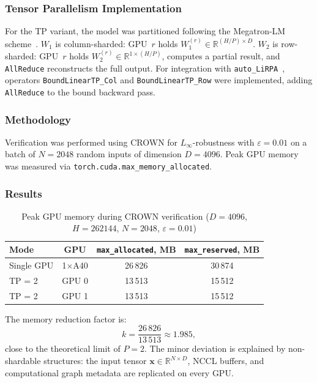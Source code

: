 \subsubsection{Tensor Parallelism Implementation}

For the TP variant, the model was partitioned following the Megatron-LM
scheme~\cite{MegatronLM2020}. $W_1$ is column-sharded: GPU~$r$ holds
$W_1^{(r)} \in \mathbb{R}^{(H/P) \times D}$. $W_2$ is row-sharded: GPU~$r$
holds $W_2^{(r)} \in \mathbb{R}^{1 \times (H/P)}$, computes a partial result,
and \texttt{AllReduce} reconstructs the full output. For integration with
\texttt{auto\_LiRPA}~\cite{AutoLiRPARepo}, operators \texttt{BoundLinearTP\_Col}
and \texttt{BoundLinearTP\_Row} were implemented, adding \texttt{AllReduce} to
the bound backward pass.

\subsubsection{Methodology}

Verification was performed using CROWN for $L_\infty$-robustness with
$\varepsilon = 0.01$ on a batch of $N = 2048$ random inputs of dimension
$D = 4096$. Peak GPU memory was measured via
\texttt{torch.cuda.max\_memory\_allocated}.

\subsubsection{Results}

\begin{table}[htbp]
\centering
\caption{Peak GPU memory during CROWN verification
($D{=}4096$, $H{=}262144$, $N{=}2048$, $\varepsilon{=}0.01$)}
\label{tab:tp-memory}
\begin{tabular}{lccc}
\toprule
Mode & GPU & \texttt{max\_allocated}, MB & \texttt{max\_reserved}, MB \\
\midrule
Single GPU & 1$\times$A40 & 26\,826 & 30\,874 \\
TP = 2     & GPU 0        & 13\,513 & 15\,512 \\
TP = 2     & GPU 1        & 13\,513 & 15\,512 \\
\bottomrule
\end{tabular}
\end{table}

The memory reduction factor is:
$$k = \frac{26\,826}{13\,513} \approx 1.985,$$
close to the theoretical limit of $P = 2$. The minor deviation is explained
by non-shardable structures: the input tensor $\mathbf{x} \in \mathbb{R}^{N \times D}$,
NCCL buffers, and computational graph metadata are replicated on every GPU.

